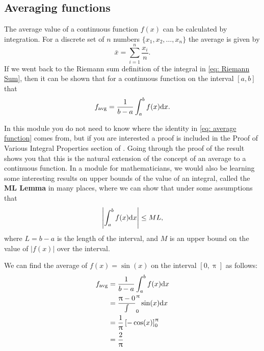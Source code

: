 \subsection*{Averaging functions}

The average value of a continuous function $f(x)$ can be calculated by integration. For  a discrete set of $n$ numbers $\{x_{1},x_{2},\dots, x_{n}\}$ the average  is given by
\begin{equation*}
\bar{x}=\sum_{i=1}^{n}\frac{x_{i}}{n}.
\end{equation*}
If we went back to the Riemann sum definition of the integral in \cref{eq: Riemann Sum}, then it can be shown that for a continuous function on the interval $[a,b]$ that
\begin{equation}
f_{\text{avg}}=\frac{1}{b-a}\int_{a}^{b}f(x)\mathrm{d} x.
\label{eq: average function}
\end{equation}

\begin{mdiv}
In this module you do not need to know where the identity in \cref{eq: average function} comes from, but if you are interested a proof is included in the Proof of Various Integral Properties section of \cite{calcI}. Going through the proof of the result shows you that this is the natural extension of the concept of an average to a continuous function. In a module for mathematicians, we would also be learning some interesting results on upper bounds of the value of an integral, called the \textbf{ML Lemma} in many places, where we can show that under some assumptions that 
\begin{equation*}
\left|\int_{a}^{b}f(x)\mathrm{d} x\right| \leq M L,
\end{equation*}
where $L=b-a$ is the length of the interval, and $M$ is an upper bound on the value of $ \vert f(x)\vert$ over the interval.
\end{mdiv}

\begin{ex}
We can find the average of $f(x)=\sin(x)$ on the interval $[0,\uppi]$ as follows:
\begin{align*}
f_{\text{avg}} 	&=\frac{1}{b-a}\int_{a}^{b}f(x)\mathrm{d} x\\
			&=\frac{\uppi-0}\int_{0}^{\uppi}\sin(x)\mathrm{d} x\\
			&=\frac{1}{\uppi}\left[-\cos(x)\right]_{0}^{\uppi}\\
			&=\frac{2}{\uppi}
\end{align*}
\end{ex}

